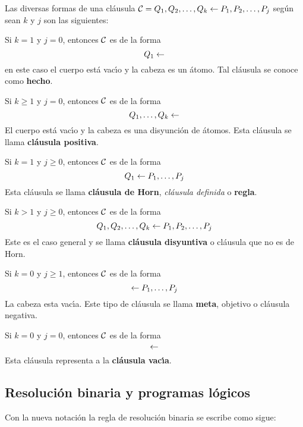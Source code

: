 \documentclass[11pt,letterpaper]{article}
\begin{document}
\noindent Las diversas formas de una cl\'ausula 
$ \C=Q_1,Q_2,\ldots, Q_k \pmi P_1, P_2,\ldots, P_j$ seg\'un sean $k$ y 
$j$ son las siguientes:
\be
 \item Si $k=1$ y $j=0$, entonces $\C$ es de la forma $$Q_1\pmi $$ 
  en este caso el cuerpo est\'a vac\'{\i}o y la cabeza es un \'atomo. 
  Tal cl\'ausula se conoce como \textbf{hecho}.
 \item Si $k\geq 1$ y $j=0$, entonces $\C$ es de la forma 
  $$ Q_1,\ldots,Q_k\pmi  $$
  El cuerpo est\'a vac\'{\i}o y la cabeza es una disyunci\'on de \'atomos. 
  Esta cl\'ausula se llama \textbf{cl\'ausula positiva}.
 \item Si $k=1$ y $j\geq 0$, entonces  $\C$ es de la forma
  $$ Q_1\pmi P_1,\ldots,P_j $$ 
  Esta cl\'ausula se llama \textbf{cl\'ausula de Horn}, 
  \emph{cl\'ausula definida} o \textbf{regla}.
 \item Si $k > 1$ y $j\geq 0$, entonces $\C$ es de la forma 
  $$ Q_1,Q_2,\ldots, Q_k \pmi P_1, P_2,\ldots, P_j $$
  Este es el caso general y se llama \textbf{cl\'ausula disyuntiva} o 
  cl\'ausula que no es de Horn.
 \item Si $k=0$ y $j\geq 1$, entonces $\C$ es de la forma
  $$ \pmi P_1,\ldots,P_j $$
  La cabeza esta vac\'{\i}a. Este tipo de cl\'ausula se llama \textbf{meta},
  objetivo o cl\'ausula negativa.
 \item Si $k=0$ y $j=0$, entonces $\C$ es de la forma 
  $$ \pmi $$
  Esta cl\'ausula representa a la \textbf{cl\'ausula vac\'{\i}a}.
\ee


\subsection{Resoluci\'on binaria y programas l\'ogicos}

Con la nueva notaci\'on la regla de resoluci\'on binaria se escribe como sigue:
\begin{mathpar}
\end{mathpar}
 
\smallskip
\end{document}
